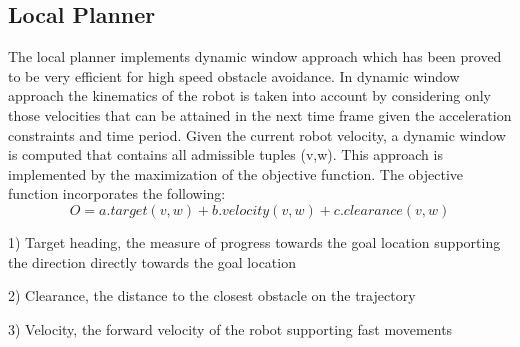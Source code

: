 \documentclass[journal,twoside]{IEEEtran}
\begin{document}
\subsection{Local Planner}
\noindent The local planner implements dynamic window approach which has been proved to be very efficient for high speed obstacle avoidance. In dynamic window approach the kinematics of the robot is taken into account by considering only those velocities that can be attained in the next time frame given the acceleration constraints and time period. Given the current robot velocity, a dynamic window is computed that contains all admissible tuples (v,w). This approach is implemented by the maximization of the objective function. The objective function incorporates the following:
\begin{equation}
O = a.target(v, w) + b.velocity(v, w) + c.clearance(v, w)
\end{equation}
\par 1) Target heading, the measure of progress towards the goal location supporting the direction directly towards the goal location 
\par 2) Clearance, the distance to the closest obstacle on the trajectory
\par 3) Velocity, the forward velocity of the robot supporting fast movements
\end{document}
